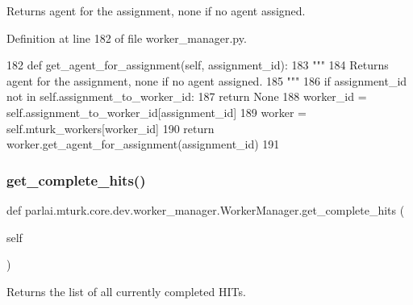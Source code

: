 \begin{DoxyVerb}Returns agent for the assignment, none if no agent assigned.
\end{DoxyVerb}
 

Definition at line 182 of file worker\+\_\+manager.\+py.


\begin{DoxyCode}
182     \textcolor{keyword}{def }get\_agent\_for\_assignment(self, assignment\_id):
183         \textcolor{stringliteral}{"""}
184 \textcolor{stringliteral}{        Returns agent for the assignment, none if no agent assigned.}
185 \textcolor{stringliteral}{        """}
186         \textcolor{keywordflow}{if} assignment\_id \textcolor{keywordflow}{not} \textcolor{keywordflow}{in} self.assignment\_to\_worker\_id:
187             \textcolor{keywordflow}{return} \textcolor{keywordtype}{None}
188         worker\_id = self.assignment\_to\_worker\_id[assignment\_id]
189         worker = self.mturk\_workers[worker\_id]
190         \textcolor{keywordflow}{return} worker.get\_agent\_for\_assignment(assignment\_id)
191 
\end{DoxyCode}
\mbox{\label{classparlai_1_1mturk_1_1core_1_1dev_1_1worker__manager_1_1WorkerManager_a21d7624c63aa1e6540db8d551a1744d2}} 
\subsubsection{\texorpdfstring{get\+\_\+complete\+\_\+hits()}{get\_complete\_hits()}}
{\footnotesize\ttfamily def parlai.\+mturk.\+core.\+dev.\+worker\+\_\+manager.\+Worker\+Manager.\+get\+\_\+complete\+\_\+hits (\begin{DoxyParamCaption}\item[{}]{self }\end{DoxyParamCaption})}

\begin{DoxyVerb}Returns the list of all currently completed HITs.
\end{DoxyVerb}
 

